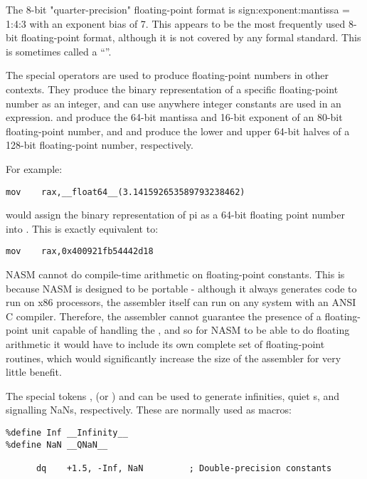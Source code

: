 The 8-bit "quarter-precision" floating-point format is
sign:exponent:mantissa = 1:4:3 with an exponent bias of 7. This
appears to be the most frequently used 8-bit floating-point format,
although it is not covered by any formal standard. This is sometimes
called a ``''.

The special operators are used to produce floating-point numbers in
other contexts. They produce the binary representation of a specific
floating-point number as an integer, and can use anywhere integer
constants are used in an expression.  and
 produce the 64-bit mantissa and 16-bit
exponent of an 80-bit floating-point number, and 
and  produce the lower and upper 64-bit halves
of a 128-bit floating-point number, respectively.

For example:

\begin{lstlisting}
mov    rax,__float64__(3.141592653589793238462)
\end{lstlisting}

would assign the binary representation of pi as a 64-bit floating
point number into . This is exactly equivalent to:

\begin{lstlisting}
mov    rax,0x400921fb54442d18
\end{lstlisting}

NASM cannot do compile-time arithmetic on floating-point constants.
This is because NASM is designed to be portable - although it always
generates code to run on x86 processors, the assembler itself can
run on any system with an ANSI C compiler. Therefore, the assembler
cannot guarantee the presence of a floating-point unit capable of
handling the , and so for NASM
to be able to do floating arithmetic it would have to include its
own complete set of floating-point routines, which would significantly
increase the size of the assembler for very little benefit.

The special tokens ,  (or
) and  can be used to generate
infinities, quiet s, and signalling NaNs,
respectively. These are normally used as macros:

\begin{lstlisting}
%define Inf __Infinity__
%define NaN __QNaN__

      dq    +1.5, -Inf, NaN         ; Double-precision constants
\end{lstlisting}

